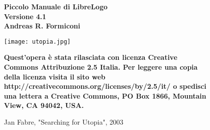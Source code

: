 \begin{titlepage}



\begin{figure}
   \centering

\vfill
{\bfseries\Large
   Piccolo Manuale di LibreLogo\\
   Versione 4.1\\
   \vskip2cm
   Andreas R. Formiconi\\
   \vskip2cm
}    
\vfill

   \texttt{[image: utopia.jpg]}
   \caption{Jan Fabre, "Searching for Utopia", 2003} 
   \label{utopia}


\vfill
{\bfseries \vskip4cm \small
Quest'opera è stata rilasciata con licenza Creative Commons Attribuzione 2.5 Italia. Per leggere una
copia della licenza visita il sito web http://creativecommons.org/licenses/by/2.5/it/ o spedisci una
lettera a Creative Commons, PO Box 1866, Mountain View, CA 94042, USA.\\
}    
\vfill

\end{figure}

\end{titlepage}


